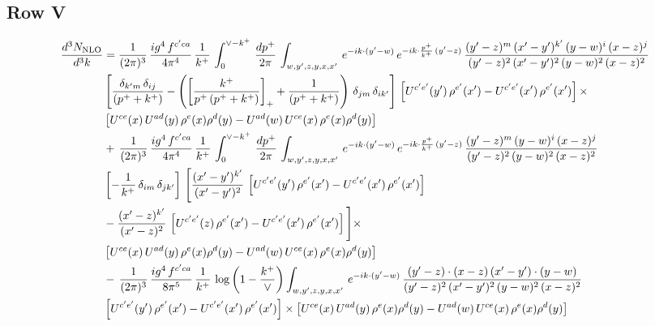 \documentclass[9pt]{article}
\numberwithin{equation}{section}
\begin{document}
\subsection{Row V}
\begin{align}
    \frac{d^{3}N_{\rm NLO}}{d^{3}k} & =  \frac{1}{(2\pi)^{3}}\, \frac{ig^{4}\,f^{c'ca}}{4\pi^{4}}\, \frac{1}{k^{+}}\,\int_{0}^{\vee-k^{+}}\, \frac{dp^{+}}{2\pi}\, \int_{w,y',z,y,x,x'}\, e^{-ik\cdot (y'-w)}\, e^{-ik\cdot \frac{p^{+}}{k^{+}}\,(y'-z)}\,\frac{(y'-z)^{m}\,(x'-y')^{k'}\,(y-w)^{i}\,(x-z)^{j}}{(y'-z)^{2}\,(x'-y')^{2}\,(y-w)^{2}\,(x-z)^{2}}\notag \\ & \left[\frac{\delta_{k'm}\,\delta_{ij}}{(p^{+}+k^{+})}-\left(\left[\frac{k^{+}}{p^{+}\,(p^{+}+k^{+})}\right]_{+}+\frac{1}{(p^{+}+k^{+})}\right)\,\delta_{jm}\,\delta_{ik'}\right]\, \left[U^{c'e'}(y')\,\rho^{e'}(x')-U^{c'e'}(x')\,\rho^{e'}(x')\right]\times \notag \\ &  \left[U^{ce}(x)\,U^{ad}(y)\,\rho^{e}(x)\rho^{d}(y)-U^{ad}(w)\,U^{ce}(x)\,\rho^{e}(x)\rho^{d}(y)\right] \notag \\
&   +\,\frac{1}{(2\pi)^{3}}\, \frac{ig^{4}\,f^{c'ca}}{4\pi^{4}}\, \frac{1}{k^{+}}\,\int_{0}^{\vee-k^{+}}\, \frac{dp^{+}}{2\pi}\, \int_{w,y',z,y,x,x'}\, e^{-ik\cdot (y'-w)}\, e^{-ik\cdot \frac{p^{+}}{k^{+}}\,(y'-z)}\,\frac{(y'-z)^{m}\,(y-w)^{i}\,(x-z)^{j}}{(y'-z)^{2}\,(y-w)^{2}\,(x-z)^{2}}\notag \\ &   \left[-\frac{1}{k^{+}}\, \delta_{im}\, \delta_{jk'}\right]\, \Bigg[\frac{(x'-y')^{k'}}{(x'-y')^{2}}\,\left[U^{c'e'}(y')\,\rho^{e'}(x')-U^{c'e'}(x')\,\rho^{e'}(x')\right]\notag \\ & -\frac{(x'-z)^{k'}}{(x'-z)^{2}}\,\left[U^{c'e'}(z)\,\rho^{e'}(x')-U^{c'e'}(x')\,\rho^{e'}(x')\right]\Bigg]\times \notag \\ &    \left[U^{ce}(x)\,U^{ad}(y)\,\rho^{e}(x)\rho^{d}(y)-U^{ad}(w)\,U^{ce}(x)\,\rho^{e}(x)\rho^{d}(y)\right] \notag \\
& -\,\frac{1}{(2\pi)^{3}}\, \frac{ig^{4}\,f^{c'ca}}{8\pi^{5}}\, \frac{1}{k^{+}}\,\log{\left(1-\frac{k^{+}}{\vee}\right)} \int_{w,y',z,y,x,x'}\, e^{-ik\cdot (y'-w)}\,\frac{(y'-z)\cdot (x-z)\,(x'-y')\cdot (y-w)}{(y'-z)^{2}\,(x'-y')^{2}\,(y-w)^{2}\,(x-z)^{2}}\notag \\ & \left[U^{c'e'}(y')\,\rho^{e'}(x')-U^{c'e'}(x')\,\rho^{e'}(x')\right]\times  \left[U^{ce}(x)\,U^{ad}(y)\,\rho^{e}(x)\rho^{d}(y)-U^{ad}(w)\,U^{ce}(x)\,\rho^{e}(x)\rho^{d}(y)\right]
\end{align}
\end{document}
